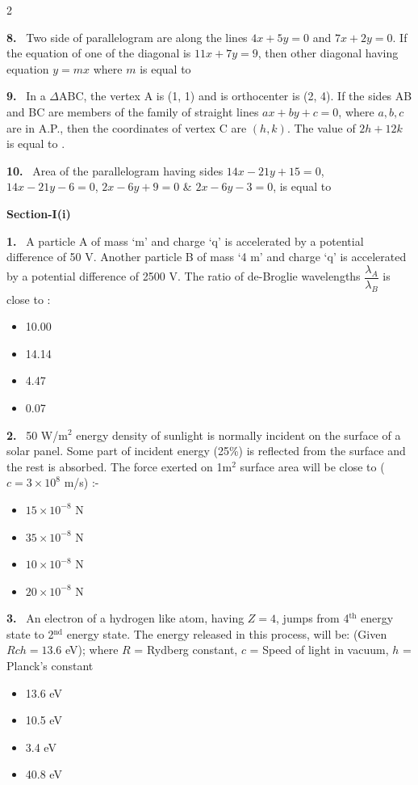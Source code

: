 \documentclass[10pt]{extarticle}
\newcommand{\papersec}[1]{\par\bigskip{\centering\Large\bfseries PAPER-#1\par}\medskip}
\newcommand{\partsec}[2]{\par\medskip\noindent{\large\bfseries PART-#1: #2}\par\smallskip}
\newcommand{\sect}[1]{\par\smallskip\noindent\textbf{#1}\par}
\newcommand{\qn}[1]{\par\smallskip\noindent\textbf{#1.}~}
\newenvironment{qoptions}{\begin{itemize}[leftmargin=1.8em,itemsep=1pt,topsep=2pt,label={}]}{\end{itemize}}
\newcommand{\opt}[2]{\item[(#1)] #2}
\begin{document}
\begin{multicols}{2}
\qn{8} Two side of parallelogram are along the lines $4x+5y=0$ and $7x+2y=0$. If the equation of one of the diagonal is $11x+7y=9$, then other diagonal having equation $y=mx$ where $m$ is equal to

\qn{9} In a $\Delta$ABC, the vertex A is (1, 1) and is orthocenter is (2, 4). If the sides AB and BC are members of the family of straight lines $ax+by+c=0$, where $a,b,c$ are in A.P., then the coordinates of vertex C are $(h,k)$. The value of $2h+12k$ is equal to \underline{\hspace{3em}}.

\qn{10} Area of the parallelogram having sides $14x-21y+15=0$, $14x-21y-6=0$, $2x-6y+9=0$ \& $2x-6y-3=0$, is equal to

\papersec{2}
\partsec{1}{PHYSICS}
\sect{Section-I(i)}

\qn{1} A particle A of mass `m' and charge `q' is accelerated by a potential difference of 50 V. Another particle B of mass `4 m' and charge `q' is accelerated by a potential difference of 2500 V. The ratio of de-Broglie wavelengths $\dfrac{\lambda_A}{\lambda_B}$ is close to :
\begin{qoptions}
\opt{A}{10.00}
\opt{B}{14.14}
\opt{C}{4.47}
\opt{D}{0.07}
\end{qoptions}

\qn{2} 50 W/m$^2$ energy density of sunlight is normally incident on the surface of a solar panel. Some part of incident energy (25\%) is reflected from the surface and the rest is absorbed. The force exerted on 1m$^2$ surface area will be close to ($c = 3\times10^8$ m/s) :-
\begin{qoptions}
\opt{A}{$15\times10^{-8}$ N}
\opt{B}{$35\times10^{-8}$ N}
\opt{C}{$10\times10^{-8}$ N}
\opt{D}{$20\times10^{-8}$ N}
\end{qoptions}

\qn{3} An electron of a hydrogen like atom, having $Z = 4$, jumps from 4$^{\text{th}}$ energy state to 2$^{\text{nd}}$ energy state. The energy released in this process, will be: (Given $Rch = 13.6$ eV); where $R$ = Rydberg constant, $c$ = Speed of light in vacuum, $h$ = Planck's constant
\begin{qoptions}
\opt{A}{13.6 eV}
\opt{B}{10.5 eV}
\opt{C}{3.4 eV}
\opt{D}{40.8 eV}
\end{qoptions}


\end{multicols}
\end{document}

